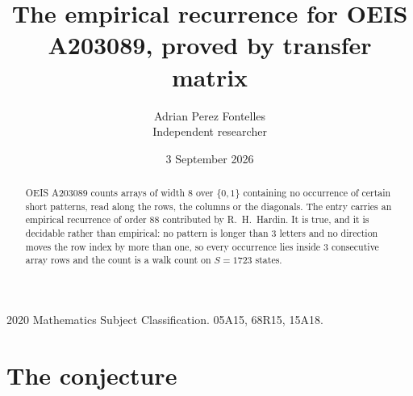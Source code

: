 \documentclass[11pt,a4paper]{article}
\title{The empirical recurrence for OEIS A203089, proved by transfer matrix}
\author{Adrian Perez Fontelles\\ \small Independent researcher}
\date{3 September 2026}
\theoremstyle{plain}
\theoremstyle{definition}
\begin{document}
\maketitle

\begin{abstract}
OEIS A203089 counts arrays of width $8$ over $\{0,1\}$ containing no occurrence of certain short
patterns, read along the rows, the columns or the diagonals. The entry carries an empirical
recurrence of order $88$ contributed by R.~H.~Hardin. It is true, and it is decidable
rather than empirical: no pattern is longer than $3$ letters and no direction moves the row
index by more than one, so every occurrence lies inside $3$ consecutive array rows and the
count is a walk count on $S=1723$ states.
\end{abstract}

\noindent\small 2020 Mathematics Subject Classification. 05A15, 68R15, 15A18.\normalsize

\section{The conjecture}
\end{document}
